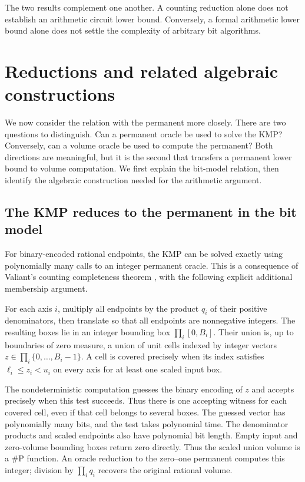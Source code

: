 \documentclass[12pt,a4paper]{article}
\theoremstyle{definition}
\theoremstyle{remark}
\begin{document}
The two results complement one another. A counting reduction alone does
not establish an arithmetic circuit lower bound. Conversely, a formal
arithmetic lower bound alone does not settle the complexity of arbitrary
bit algorithms.

\section{Reductions and related algebraic constructions}
\label{sec:directions}

We now consider the relation with the permanent more closely. There
are two questions to distinguish. Can a permanent oracle be used to
solve the KMP? Conversely, can a volume oracle be used to compute
the permanent? Both directions are meaningful, but it is the second
that transfers a permanent lower bound to volume computation. We first
explain the bit-model relation, then identify the algebraic construction
needed for the arithmetic argument.

\subsection{The KMP reduces to the permanent in the bit model}

For binary-encoded rational endpoints, the KMP can be solved exactly
using polynomially many calls to an integer permanent oracle. This is a
consequence of Valiant's counting completeness theorem
\cite[Theorem 1]{ValiantCounting}, with the following explicit additional
membership argument.

For each axis $i$, multiply all endpoints by the product $q_i$ of their
positive denominators, then translate so that all endpoints are
nonnegative integers. The resulting boxes lie in an integer bounding
box $\prod_i[0,B_i]$. Their union is, up to boundaries of zero measure,
a union of unit cells indexed by integer vectors
$z\in\prod_i\{0,\ldots,B_i-1\}$. A cell is covered precisely when
its index satisfies $\ell_i\le z_i<u_i$ on every axis for at least one
scaled input box.

The nondeterministic computation guesses the binary encoding of $z$
and accepts precisely when this test succeeds. Thus there is one
accepting witness for each covered cell, even if that cell belongs to
several boxes. The guessed
vector has polynomially many bits, and the test takes polynomial time.
The denominator products and scaled endpoints also have polynomial
bit length. Empty input and zero-volume bounding boxes return zero
directly. Thus the scaled union volume is a $\#\mathrm P$ function.
An oracle reduction to the zero--one permanent computes this integer;
division by $\prod_i q_i$ recovers the original rational volume.
\end{document}
